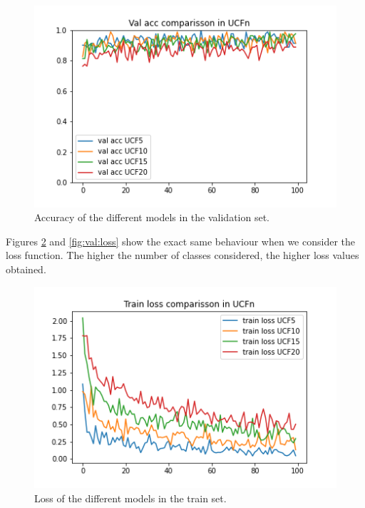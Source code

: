 \documentclass[letterpaper, 10 pt, conference]{ieeeconf}
\begin{document}
\begin{figure}[]
    \centering
    \includegraphics[scale=0.6]{Figures/UCF_val_acc_comparisson.png}
    \caption{Accuracy of the different models in the validation set.}
    \label{fig:val:acc}
\end{figure}

Figures \ref{fig:train:loss} and \ref{fig:val:loss} show the exact same behaviour when we consider the loss function. The higher the number of classes considered, the higher loss values obtained.

\begin{figure}[]
    \centering
    \includegraphics[scale=0.6]{Figures/UCF_train_loss_comparisson.png}
    \caption{Loss of the different models in the train set.}
    \label{fig:train:loss}
\end{figure}
\end{document}
